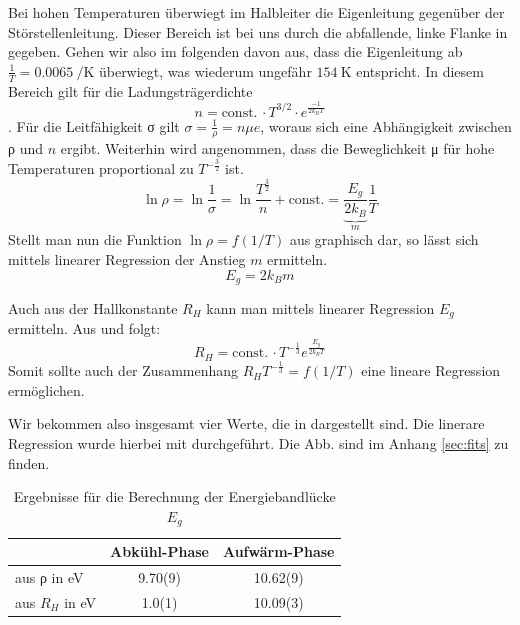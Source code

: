 Bei hohen Temperaturen überwiegt im Halbleiter die Eigenleitung gegenüber der
Störstellenleitung. Dieser Bereich ist bei uns durch die abfallende, linke Flanke
in  gegeben. Gehen wir also im folgenden davon aus, dass
die Eigenleitung ab $\frac{1}{T} = \SI{0.0065}{\per\kelvin}$ überwiegt, was wiederum
ungefähr $\SI{154}{\kelvin}$ entspricht. In diesem Bereich gilt für die
Ladungsträgerdichte
\begin{equation}
 n = \mbox{const.} \, \cdot T^{3/2}\cdot e^{\frac{-1}{2k_BT}}
 \label{eqn:n_T}
\end{equation}
. Für die Leitfähigkeit σ gilt $σ = \frac{1}{ρ} = nμe$, woraus sich eine
Abhängigkeit zwischen ρ und $n$ ergibt. Weiterhin wird angenommen, dass die
Beweglichkeit μ für hohe Temperaturen proportional zu $T^{-\frac{3}{2}}$ ist.
\begin{equation}
 \ln ρ = \ln\frac{1}{σ} = \ln\frac{T^{\frac{3}{2}}}{n}+\mbox{const.} = \underbrace{\frac{E_g}{2k_B}}_{m}\frac{1}{T}
 \label{eqn:Eg_rho}
\end{equation}
Stellt man nun die Funktion $\ln ρ = f(1/T)$ aus  graphisch dar,
so lässt sich mittels linearer Regression der Anstieg $m$ ermitteln.
\begin{equation}
 E_g = 2 k_B m
\end{equation}

Auch aus der Hallkonstante $R_H$ kann man mittels linearer Regression $E_g$
ermitteln. Aus  und  folgt:
\begin{equation}
 R_H = \mbox{const.} \, \cdot T^{-\frac{1}{3}} e^{\frac{E_g}{2 k_B T}}
\end{equation}
Somit sollte auch der Zusammenhang $R_HT^{-\frac{1}{3}} = f(1/T)$ eine lineare
Regression ermöglichen.

Wir bekommen also insgesamt vier Werte, die in  dargestellt sind.
Die linerare Regression wurde hierbei mit \cite{gnuplot} durchgeführt. Die Abb.
sind im Anhang \ref{sec:fits} zu finden.

\begin{table}[htbp]
\centering
\setlength{\tabcolsep}{5pt}
\begin{tabular*}{\columnwidth}{lS[table-format = 2.2,table-figures-uncertainty = 1]S[table-format = 1.2,table-figures-uncertainty = 1]}
\toprule
& {Abkühl-Phase} & {Aufwärm-Phase} \\
\midrule
aus ρ in \si{\electronvolt} & 9.70(9) & 10.62(9) \\
aus $R_H$ in \si{\electronvolt} & 1.0(1) & 10.09(3) \\
\bottomrule
\end{tabular*}
\caption{Ergebnisse für die Berechnung der Energiebandlücke $E_g$}
\label{tab:E_g}
\end{table}


